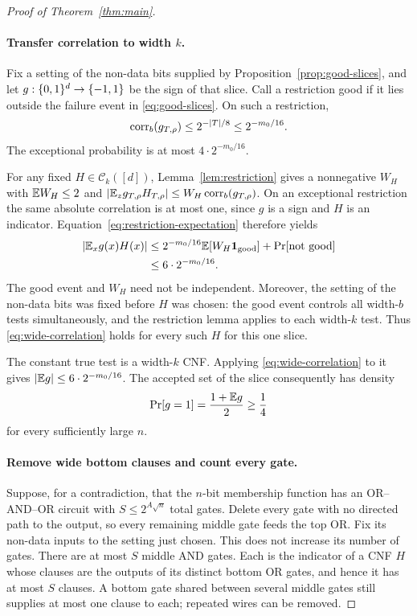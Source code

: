\begin{proof}[Proof of Theorem~\ref{thm:main}]
\paragraph{Transfer correlation to width \(k\).}
Fix a setting of the non-data bits supplied by
Proposition~\ref{prop:good-slices}, and let \(g:\{0,1\}^d\to\{-1,1\}\)
be the sign of that slice.
Call a restriction good if it lies outside the failure event in
\eqref{eq:good-slices}.  On such a restriction,
\[
 \operatorname{corr}_b(g_{T,\rho})
 \le2^{-|T|/8}\le2^{-m_0/16}.
\]
The exceptional probability is at most \(4\cdot2^{-m_0/16}\).

For any fixed \(H\in\mathcal C_k([d])\),
Lemma~\ref{lem:restriction} gives a nonnegative \(W_H\) with
\(\mathbb E W_H\le2\) and
\(\left|\mathbb E_z g_{T,\rho}H_{T,\rho}\right|\le W_H\operatorname{corr}_b(g_{T,\rho})\).
On an exceptional restriction the same absolute correlation is at
most one, since \(g\) is a sign and \(H\) is an indicator.
Equation~\eqref{eq:restriction-expectation} therefore yields
\begin{align}
 \left|\mathbb E_xg(x)H(x)\right|
 &\le 2^{-m_0/16}\mathbb E[W_H\mathbf 1_{\mathrm{good}}]
        +\Pr[\mathrm{not\ good}]\notag\\
 &\le6\cdot2^{-m_0/16}.
 \label{eq:wide-correlation}
\end{align}
The good event and \(W_H\) need not be independent.
Moreover, the setting of the non-data bits was fixed before \(H\)
was chosen: the good event controls all width-\(b\) tests simultaneously,
and the restriction lemma applies to each width-\(k\) test.
Thus \eqref{eq:wide-correlation} holds for every such \(H\)
for this one slice.

The constant true test is a width-\(k\) CNF.  Applying
\eqref{eq:wide-correlation} to it gives
\(\left|\mathbb E g\right|\le6\cdot2^{-m_0/16}\).
The accepted set of the slice consequently has density
\begin{equation}\label{eq:accepted-density}
 \Pr[g=1]=\frac{1+\mathbb E g}{2}\ge\frac14
\end{equation}
for every sufficiently large \(n\).

\paragraph{Remove wide bottom clauses and count every gate.}
Suppose, for a contradiction, that the \(n\)-bit membership function
has an OR--AND--OR circuit with \(S\le2^{A\sqrt n}\) total gates.
Delete every gate with no directed path to the output, so every
remaining middle gate feeds the top OR.
Fix its non-data inputs to the setting just chosen.
This does not increase its number of gates.
There are at most \(S\) middle AND gates.  Each is the indicator
of a CNF \(H\) whose clauses are the outputs of its distinct bottom
OR gates, and hence it has at most \(S\) clauses.
A bottom gate shared between several middle gates still supplies at
most one clause to each; repeated wires can be removed.


\end{proof}
